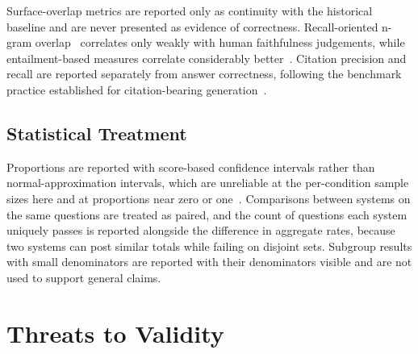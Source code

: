 Surface-overlap metrics are reported only as continuity with the historical baseline and are never presented as evidence of correctness. Recall-oriented n-gram overlap~\cite{lin2004rouge} correlates only weakly with human faithfulness judgements, while entailment-based measures correlate considerably better~\cite{maynez2020faithfulness}. Citation precision and recall are reported separately from answer correctness, following the benchmark practice established for citation-bearing generation~\cite{gao2023alce}.

\subsection{Statistical Treatment}

Proportions are reported with score-based confidence intervals rather than normal-approximation intervals, which are unreliable at the per-condition sample sizes here and at proportions near zero or one~\cite{wilson1927probable}. Comparisons between systems on the same questions are treated as paired, and the count of questions each system uniquely passes is reported alongside the difference in aggregate rates, because two systems can post similar totals while failing on disjoint sets. Subgroup results with small denominators are reported with their denominators visible and are not used to support general claims.

\section{Threats to Validity}
\label{sec:method-threats}


